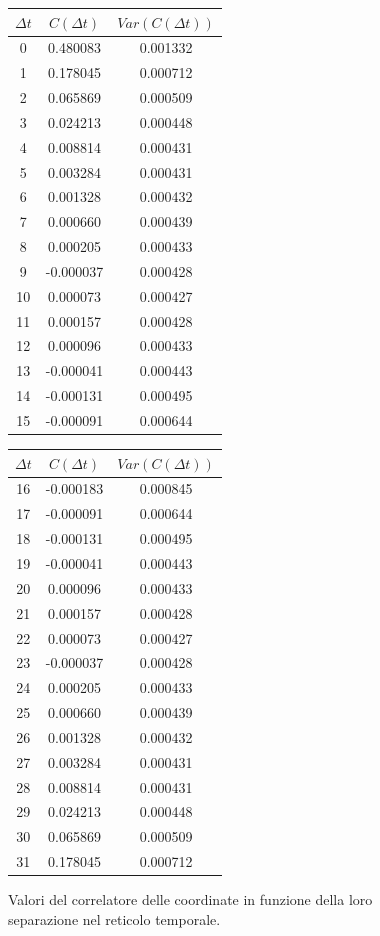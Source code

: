 \begin{figure}[H]
\centering
\begin{tabular}{|c|c|c|}
\hline
$\Delta t$ & $C(\Delta t)$ & $Var(C(\Delta t))$\\
\hline
0 & 0.480083 & 0.001332\\
1 & 0.178045 & 0.000712\\
2 & 0.065869 & 0.000509\\
3 & 0.024213 & 0.000448\\
4 & 0.008814 & 0.000431\\
5 & 0.003284 & 0.000431\\
6 & 0.001328 & 0.000432\\
7 & 0.000660 & 0.000439\\
8 & 0.000205 & 0.000433\\
9 & -0.000037 & 0.000428\\
10 & 0.000073 & 0.000427\\
11 & 0.000157 & 0.000428\\
12 & 0.000096 & 0.000433\\
13 & -0.000041 & 0.000443\\
14 & -0.000131 & 0.000495\\
15 & -0.000091 & 0.000644\\

\hline
\end{tabular}
\quad
\begin{tabular}{|c|c|c|}
\hline
$\Delta t$ & $C(\Delta t)$ & $Var(C(\Delta t))$\\
\hline
16 & -0.000183 & 0.000845\\
17 & -0.000091 & 0.000644\\
18 & -0.000131 & 0.000495\\
19 & -0.000041 & 0.000443\\
20 & 0.000096 & 0.000433\\
21 & 0.000157 & 0.000428\\
22 & 0.000073 & 0.000427\\
23 & -0.000037 & 0.000428\\
24 & 0.000205 & 0.000433\\
25 & 0.000660 & 0.000439\\
26 & 0.001328 & 0.000432\\
27 & 0.003284 & 0.000431\\
28 & 0.008814 & 0.000431\\
29 & 0.024213 & 0.000448\\
30 & 0.065869 & 0.000509\\
31 & 0.178045 & 0.000712\\
\hline
\end{tabular}
\caption{Valori del correlatore delle coordinate in funzione della loro separazione nel reticolo temporale.}
\label{tab:correlation}
\end{figure}

